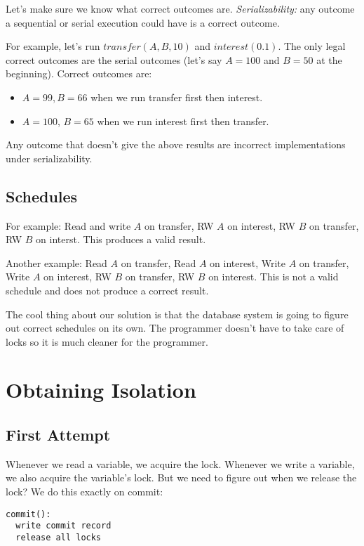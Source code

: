 \documentclass[psamsfonts]{amsart}
\begin{document}
Let's make sure we know what correct outcomes are. \emph{Serializability:} any outcome a sequential or serial execution could have is a correct outcome.

For example, let's run $transfer(A,B,10)$ and $interest(0.1)$. The only legal correct outcomes are the serial outcomes (let's say $A=100$ and $B=50$ at the beginning). Correct outcomes are:
\begin{itemize}
  \item $A = 99, B = 66$ when we run transfer first then interest.
  \item $A = 100$, $B = 65$ when we run interest first then transfer.
\end{itemize}

Any outcome that doesn't give the above results are incorrect implementations under serializability.

\subsection{Schedules}

For example: Read and write $A$ on transfer, RW $A$ on interest, RW $B$ on transfer, RW $B$ on interst. This produces a valid result.

Another example: Read $A$ on transfer, Read $A$ on interest, Write $A$ on transfer, Write $A$ on interest, RW $B$ on transfer, RW $B$ on interest. This is not a valid schedule and does not produce a correct result.

The cool thing about our solution is that the database system is going to figure out correct schedules on its own. The programmer doesn't have to take care of locks so it is much cleaner for the programmer.

\section{Obtaining Isolation}

\subsection{First Attempt}

Whenever we read a variable, we acquire the lock. Whenever we write a variable, we also acquire the variable's lock. But we need to figure out when we release the lock? We do this exactly on commit:

\begin{verbatim}
commit():
  write commit record
  release all locks
\end{verbatim}
\end{document}
